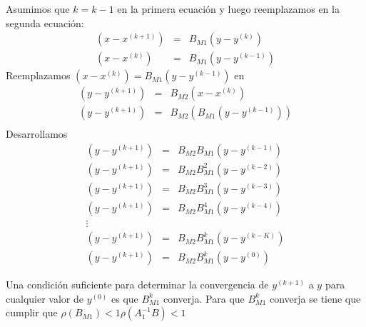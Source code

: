 \begin{itemize}
    Asumimos que $k = k -1$ en la primera ecuación y luego reemplazamos en la segunda ecuación:
    \begin{eqnarray*}
        (x - x^{(k + 1)}) & = &  B_{M1}(y - y^{(k)})\\
        (x - x^{(k)}) & = &  B_{M1}(y - y^{(k - 1)})
    \end{eqnarray*} 
    Reemplazamos $(x - x^{(k)}) =  B_{M1}(y - y^{(k - 1)})$  en 
     \begin{eqnarray*}
        (y - y^{(k + 1)}) & = &  B_{M2}(x - x^{(k)})\\
        (y - y^{(k + 1)}) & = &  B_{M2}( B_{M1}(y - y^{(k - 1)}))\\
    \end{eqnarray*} 
    Desarrollamos
    \begin{eqnarray*}
        (y - y^{(k + 1)}) & = &  B_{M2} B_{M1}(y - y^{(k - 1)})\\
        (y - y^{(k + 1)}) & = &  B_{M2} B_{M1}^{2}(y - y^{(k - 2)})\\
        (y - y^{(k + 1)}) & = &  B_{M2} B_{M1}^{3}(y - y^{(k - 3)})\\
        (y - y^{(k + 1)}) & = &  B_{M2} B_{M1}^{4}(y - y^{(k - 4)})\\
        \vdots \\
        (y - y^{(k + 1)}) & = &  B_{M2} B_{M1}^{k}(y - y^{(k - K)})\\
        (y - y^{(k + 1)}) & = &  B_{M2} B_{M1}^{k}(y - y^{(0)})
    \end{eqnarray*} 
    
    
    Una condición suficiente para determinar la convergencia de $y^{(k + 1)}$ a $y$ para cualquier valor de $y^{(0)}$ es que $B_{M1}^{k}$ converja. Para que $B_{M1}^{k}$ converja se tiene que cumplir que  $\rho (B_{M1}) < 1 \rho (A_{1}^{-1}B) < 1$ \\
    
   
\end{itemize}
